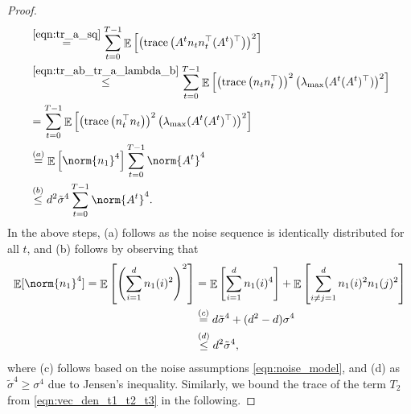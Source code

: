 \documentclass[letterpaper, 11 pt]{article}
\newcommand{\tr}[1]{\text{trace}\left( #1 \right)}
\DeclareMathOperator{\E}{\mathbb{E}}
\begin{document}
\begin{proof}
\begin{align}
    &\overset{\eqref{eqn:tr_a_sq}}{=} \sum_{t=0}^{T-1} \E\left[\left(\tr{A^tn_tn_t^{\top}(A^t)^{\top}}\right)^2\right] \nonumber\\
    & \overset{\eqref{eqn:tr_ab_tr_a_lambda_b}}{\leq} \sum_{t=0}^{T-1} \E\left[\left(\tr{n_tn_t^{\top}}\right)^2\big(\lambda_{\max}(A^t(A^t)^{\top})\big)^2\right] \nonumber\\
    & = \sum_{t=0}^{T-1} \E\left[\left(\tr{n_t^{\top}n_t}\right)^2\big(\lambda_{\max}(A^t(A^t)^{\top})\big)^2\right] \nonumber\\
    &\overset{(a)}{=} \E\left[\norm{n_1}^4\right]\sum_{t=0}^{T-1} \norm{A^t}^4 \nonumber\\
    &\overset{(b)}{\leq} d^2 \tilde{\sigma}^4 \sum_{t=0}^{T-1} \norm{A^t}^4 \label{eqn:t1bound}.
\end{align}
In the above steps, (a) follows as the noise sequence is identically distributed for all $t$, and (b) follows by observing that 
\begin{align*}
    \E[\norm{n_1}^4] = \E\left[ \left(\sum_{i = 1}^d n_1(i)^2 \right)^2 \right] &= \E\left[\sum_{i = 1}^d n_1(i)^4 \right]+\E\left[\sum_{i \neq j = 1}^d n_1(i)^2 n_1(j)^2 \right] \\
    &\overset{(c)}{=} d\tilde{\sigma}^4 + (d^2 - d)\sigma^4 \\
    &\overset{(d)}{\leq} d^2 \tilde{\sigma}^4,
\end{align*}
where (c) follows based on the noise assumptions \eqref{eqn:noise_model}, and (d) as $\tilde{\sigma}^4 \geq \sigma^4$ due to Jensen's inequality. Similarly, we bound the trace of the term $T_2$ from \eqref{eqn:vec_den_t1_t2_t3} in the following.


\end{proof}
\end{document}
